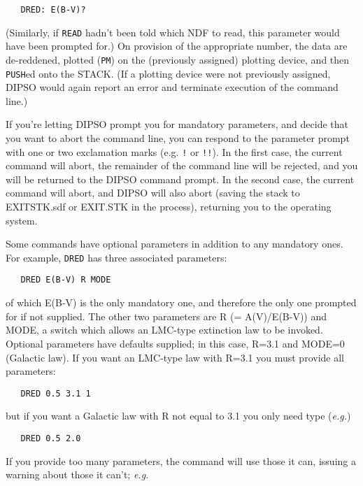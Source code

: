 \documentclass[twoside,11pt]{article}
\newcommand{\htmlref}[2]{#1}
\renewcommand{\_}{\texttt{\symbol{95}}}
\begin{document}
\begin{verbatim}
   DRED: E(B-V)?
\end{verbatim}

(Similarly, if \htmlref{{\tt{READ}}}{COM:READ}  hadn't been told which NDF to read, this
parameter would have been prompted for.) On provision of the
appropriate number, the data are de-reddened, plotted (\htmlref{{\tt{PM}}}{COM:PM})  on the
(previously assigned) plotting device, and then \htmlref{{\tt
PUSH}}{COM:PUSH}ed onto the STACK.
(If a plotting device were not previously assigned, DIPSO would again
report an error and terminate execution of the command line.)

If you're letting DIPSO prompt you for mandatory parameters, and decide
that you want to abort the command line, you can respond to the parameter
prompt with one or two exclamation marks (e.g. {\tt{!}}  or {\tt{!!}}).  In the
first case, the current command will abort, the remainder of the command
line will be rejected, and you will be returned to the DIPSO command
prompt. In the second case, the current command will abort, and DIPSO
will also abort (saving the stack to EXIT\_STK.sdf or EXIT.STK in the
process), returning you to the operating system.

Some commands have optional parameters in addition to any mandatory
ones. For example, \htmlref{{\tt{DRED}}}{COM:DRED}  has three associated parameters:

\begin{verbatim}
   DRED E(B-V) R MODE
\end{verbatim}

of which E(B-V) is the only mandatory one, and therefore the only one
prompted for if not supplied. The other two parameters are R (=
A(V)/E(B-V)) and MODE, a switch which allows an LMC-type extinction
law to be invoked. Optional parameters have defaults supplied; in this
case, R=3.1 and MODE=0 (Galactic law). If you want an LMC-type law
with R=3.1 you must provide all parameters:

\begin{verbatim}
   DRED 0.5 3.1 1
\end{verbatim}

but if you want a Galactic law with R not equal to 3.1 you only need
type ({\em e.g.})

\begin{verbatim}
   DRED 0.5 2.0
\end{verbatim}

If you provide too many parameters, the command will use those it can,
issuing a warning about those it can't; {\em e.g.}
\end{document}
